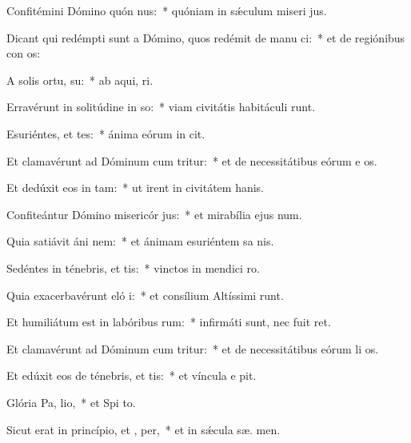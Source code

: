 \item Confitémini Dómino quón nus:~* quóniam in sǽculum miseri jus.
\item Dicant qui redémpti sunt a Dómino, quos redémit de manu ci:~* et de regiónibus con os:
\item A solis ortu,  su:~* ab aqui,  ri.
\item Erravérunt in solitúdine in so:~* viam civitátis habitáculi  runt.
\item Esuriéntes, et tes:~* ánima eórum in  cit.
\item Et clamavérunt ad Dóminum cum tritur:~* et de necessitátibus eórum e os.
\item Et dedúxit eos in  tam:~* ut irent in civitátem hanis.
\item Confiteántur Dómino misericór jus:~* et mirabília ejus  num.
\item Quia satiávit áni nem:~* et ánimam esuriéntem sa nis.
\item Sedéntes in ténebris, et  tis:~* vinctos in mendici  ro.
\item Quia exacerbavérunt eló i:~* et consílium Altíssimi runt.
\item Et humiliátum est in labóribus  rum:~* infirmáti sunt, nec fuit  ret.
\item Et clamavérunt ad Dóminum cum tritur:~* et de necessitátibus eórum li os.
\item Et edúxit eos de ténebris, et  tis:~* et víncula e pit.
\item Glória Pa,  lio,~* et Spi to.
\item Sicut erat in princípio, et ,  per,~* et in sǽcula sæ. men.
